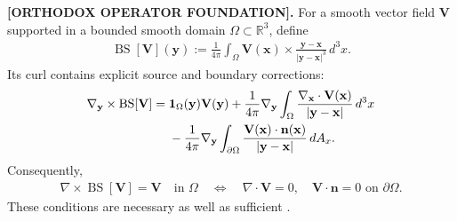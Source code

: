 \documentclass[11pt]{article}
\theoremstyle{definition}
\theoremstyle{plain}
\theoremstyle{remark}
\begin{document}
        \textbf{[ORTHODOX OPERATOR FOUNDATION].}
        For a smooth vector field \(\mathbf V\) supported in a bounded smooth domain
        \(\Omega\subset\mathbb R^3\), define
        \begin{align}
            \operatorname{BS}[\mathbf V](\mathbf y)
            :=
            \frac{1}{4\pi}
            \int_\Omega
            \mathbf V(\mathbf x)\times
            \frac{\mathbf y-\mathbf x}{|\mathbf y-\mathbf x|^3}
            \,d^3x.
            \label{eq:canon_bounded_biot_savart}
        \end{align}
        Its curl contains explicit source and boundary corrections:
        \begin{align}
            \nabla_{\mathbf y}\times\operatorname{BS}[\mathbf V]
            ={}&
            \mathbf 1_\Omega(\mathbf y)\mathbf V(\mathbf y)
            +
            \frac{1}{4\pi}\nabla_{\mathbf y}
            \int_\Omega
            \frac{\nabla_{\mathbf x}\cdot\mathbf V(\mathbf x)}
                 {|\mathbf y-\mathbf x|}
            \,d^3x
            \notag\\
            &-
            \frac{1}{4\pi}\nabla_{\mathbf y}
            \int_{\partial\Omega}
            \frac{\mathbf V(\mathbf x)\cdot\mathbf n(\mathbf x)}
                 {|\mathbf y-\mathbf x|}
            \,dA_x.
            \label{eq:canon_biot_savart_curl_corrections}
        \end{align}
        Consequently,
        \begin{align}
            \nabla\times\operatorname{BS}[\mathbf V]
            =
            \mathbf V
            \quad\text{in }\Omega
            \quad\Longleftrightarrow\quad
            \nabla\cdot\mathbf V=0,
            \quad
            \mathbf V\cdot\mathbf n=0
            \text{ on }\partial\Omega.
            \label{eq:canon_biot_savart_left_inverse_gate}
        \end{align}
        These conditions are necessary as well as sufficient
        \cite{CantarellaDeTurckGluck2001BiotSavart}.
\end{document}
